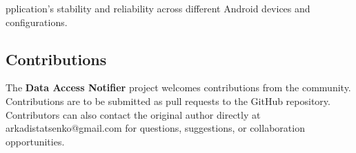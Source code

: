 pplication's stability and reliability across different Android devices and configurations.

\subsection{Contributions}
The \textbf{Data Access Notifier} project welcomes contributions from the community. Contributions are to be submitted as pull requests to the GitHub repository. Contributors can also contact the original author directly at arkadistatsenko@gmail.com for questions, suggestions, or collaboration opportunities.




